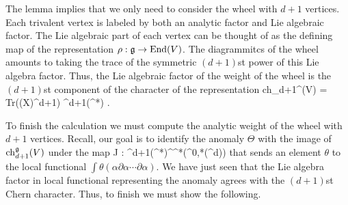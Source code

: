 \documentclass[10pt]{amsart}
\def\brian{\textcolor{blue}{BW: }\textcolor{blue}}
\begin{document}

%

The lemma implies that we only need to consider the wheel with $d+1$ vertices. 
Each trivalent vertex is labeled by both an analytic factor and Lie algebraic factor. 
The Lie algebraic part of each vertex can be thought of as the defining map of the representation $\rho : \mathfrak g \to {\rm End}(V)$. 
The diagrammitcs of the wheel amounts to taking the trace of the symmetric $(d+1)$st power of this Lie algebra factor. 
Thus, the Lie algebraic factor of the weight of the wheel is the $(d+1)$st component of the character of the representation
\ben
{\rm ch}_{d+1}^\fg(V) =  {\rm Tr}\left(\rho(X)^{d+1}\right) \in \Sym^{d+1}(\fg^*) .
\een

To finish the calculation we must compute the analytic weight of the wheel with $d+1$ vertices. 
Recall, our goal is to identify the anomaly $\Theta$ with the image of ${\rm ch}_{d+1}^\mathfrak g(V)$ under the map
\ben
J : \Sym^{d+1}(\fg^*)^\fg \to \cloc^*(\Omega^{0,*}(\CC^d)\tensor \fg)
\een
that sends an element $\theta$ to the local functional $\int \theta(\alpha \partial \alpha \cdots \partial \alpha)$. 
We have just seen that the Lie algebra factor in local functional representing the anomaly agrees with the $(d+1)$st Chern character. 
Thus, to finish we must show the following.
\end{document}
